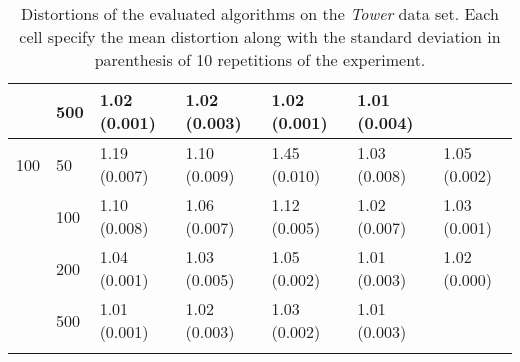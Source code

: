 \begin{longtable}{lllllll}
    & 500 &  1.02 (0.001) &   1.02 (0.003) &  1.02 (0.001) &         1.01 (0.004) &  \\
 \midrule
100 & 50  &  1.19 (0.007) &   1.10 (0.009) &  1.45 (0.010) &         1.03 (0.008) &  1.05 (0.002) \\
    & 100 &  1.10 (0.008) &   1.06 (0.007) &  1.12 (0.005) &         1.02 (0.007) &  1.03 (0.001) \\
    & 200 &  1.04 (0.001) &   1.03 (0.005) &  1.05 (0.002) &         1.01 (0.003) &  1.02 (0.000) \\
    & 500 &  1.01 (0.001) &   1.02 (0.003) &  1.03 (0.002) &         1.01 (0.003) &            \\
\bottomrule
\caption{Distortions of the evaluated algorithms on the \textit{Tower} data set. Each cell specify the mean distortion along with the standard deviation in parenthesis of 10 repetitions of the experiment.}
\label{tab:distortions-mean-std-tower}
\end{longtable}

